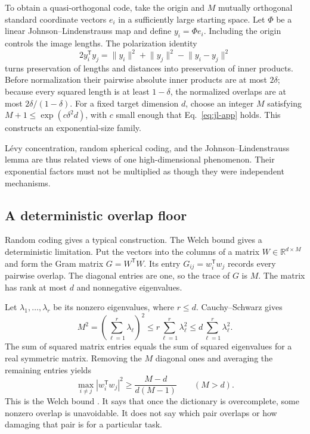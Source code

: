\documentclass[
  aps,
  reprint,
  superscriptaddress,
  floatfix,
  nofootinbib,
  longbibliography
]{revtex4-2}
\newcommand{\R}{\mathbb{R}}
\newcommand{\T}{^{\mathsf T}}
\newcommand{\norm}[1]{\lVert #1\rVert}
\begin{document}
To obtain a quasi-orthogonal code, take the origin and $M$ mutually orthogonal
standard coordinate vectors $e_i$ in a sufficiently large starting space.
Let $\Phi$ be a linear Johnson--Lindenstrauss map and define
$y_i=\Phi e_i$.  Including the origin controls the image lengths.  The
polarization identity
\begin{equation}
 2y_i\T y_j=\norm{y_i}^2+\norm{y_j}^2-\norm{y_i-y_j}^2
 \label{eq:polarization-app}
\end{equation}
turns preservation of lengths and distances into preservation of inner
products.  Before normalization their pairwise absolute inner products are at
most $2\delta$; because every squared length is at least $1-\delta$, the
normalized overlaps are at most $2\delta/(1-\delta)$.  For a fixed target
dimension $d$, choose an integer $M$ satisfying
$M+1\leq\exp(c\delta^2d)$, with $c$ small enough that
Eq.~\eqref{eq:jl-app} holds.  This constructs an exponential-size family.

L\'evy concentration, random spherical coding, and the
Johnson--Lindenstrauss lemma are thus related views of one high-dimensional
phenomenon.  Their exponential factors must not be multiplied as though they
were independent mechanisms.

\subsection{A deterministic overlap floor}

Random coding gives a typical construction.  The Welch bound gives a
deterministic limitation.  Put the vectors into the columns of a matrix
$W\in\R^{d\times M}$ and form the Gram matrix $G=W\T W$.  Its entry
$G_{ij}=w_i\T w_j$ records every pairwise overlap.  The diagonal entries are
one, so the trace of $G$ is $M$.  The matrix has rank at most $d$ and
nonnegative eigenvalues.

Let $\lambda_1,\ldots,\lambda_r$ be its nonzero eigenvalues, where $r\leq d$.
Cauchy--Schwarz gives
\begin{equation}
 M^2=\left(\sum_{\ell=1}^r\lambda_\ell\right)^2
 \leq r\sum_{\ell=1}^r\lambda_\ell^2
 \leq d\sum_{\ell=1}^r\lambda_\ell^2.
 \label{eq:eigen-cs-app}
\end{equation}
The sum of squared matrix entries equals the sum of squared eigenvalues for a
real symmetric matrix.  Removing the $M$ diagonal ones and averaging the
remaining entries yields
\begin{equation}
 \max_{i\ne j}|w_i\T w_j|^2
 \geq \frac{M-d}{d(M-1)}
 \qquad (M>d).
 \label{eq:welch-app}
\end{equation}
This is the Welch bound \cite{welch1974coherence}.  It says that once the
dictionary is overcomplete, some nonzero overlap is unavoidable.  It does not
say which pair overlaps or how damaging that pair is for a particular task.
\end{document}
